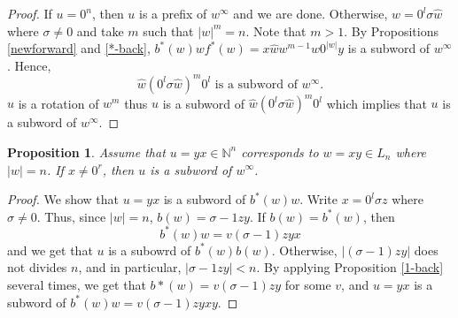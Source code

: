 \documentclass{article}
\newtheorem{proposition}[theorem]{Proposition}
\theoremstyle{definition}
\begin{document}
\begin{proof}
If $u=0^n$, then $u$ is a prefix of $w^\infty$ and we are done. Otherwise, $w=0^l\sigma\hat{w}$ where $\sigma\neq 0$ and take $m$ such that $|w|^m=n$. Note that $m>1$. By Propositions \ref{newforward} and  \ref{*-back}, $b^*(w)wf^*(w)=x\hat{w}w^{m-1}w0^|w|y$ is a subword of $w^\infty$. Hence, 
$$\hat{w}(0^l\sigma\hat{w})^m0^l \text{ is a subword of } w^\infty.$$
$u$ is a rotation of $w^m$ thus $u$ is a subword of $\hat{w}(0^l\sigma\hat{w})^m0^l$ which implies that $u$ is a subword of $w^\infty$.
\end{proof}


\begin{proposition}
Assume that $u=yx\in\mathbb{N}^n$ corresponds to $w=xy\in L_n$ where $|w|=n$. If $x\neq 0^r$, then $u$ is a subword of $w^\infty$. 
\end{proposition}

\begin{proof}
We show that $u=yx$ is a subword of $b^*(w)w$. Write $x=0^l\sigma z$ where $\sigma\neq 0$. Thus, since $|w|=n$, $b(w)=\sigma-1zy$. If $b(w)=b^*(w)$, then 
$$b^*(w)w=v(\sigma-1)zyx$$
and we get that $u$ is a subowrd of $b^*(w)b(w)$. Otherwise, $|(\sigma-1)zy|$ does not divides $n$, and in particular, $|\sigma-1zy|<n$. By applying Proposition \ref{1-back} several times, we get that $b*(w)=v(\sigma-1)zy$ for some $v$, and $u=yx$ is a subword of $b^*(w)w=v(\sigma-1)zyxy$.
\end{proof}
\end{document}
